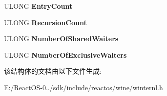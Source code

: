 \begin{DoxyCompactItemize}
\mbox{\label{struct___d_e_b_u_g___l_o_c_k___i_n_f_o_r_m_a_t_i_o_n_aebfe10b6c233b988ad9a8b3b876435b1}} 
U\+L\+O\+NG {\bfseries Entry\+Count}
\item 
\mbox{\label{struct___d_e_b_u_g___l_o_c_k___i_n_f_o_r_m_a_t_i_o_n_ab6a46410283b5aa5d7630f73743fc5a4}} 
U\+L\+O\+NG {\bfseries Recursion\+Count}
\item 
\mbox{\label{struct___d_e_b_u_g___l_o_c_k___i_n_f_o_r_m_a_t_i_o_n_a0942fe816bcc2dc81dc0b42c4f07841f}} 
U\+L\+O\+NG {\bfseries Number\+Of\+Shared\+Waiters}
\item 
\mbox{\label{struct___d_e_b_u_g___l_o_c_k___i_n_f_o_r_m_a_t_i_o_n_a6c8e17f7cf36f9dced58f0f592bee335}} 
U\+L\+O\+NG {\bfseries Number\+Of\+Exclusive\+Waiters}
\end{DoxyCompactItemize}


该结构体的文档由以下文件生成\+:\begin{DoxyCompactItemize}
\item 
E\+:/\+React\+O\+S-\/0../sdk/include/reactos/wine/winternl.\+h\end{DoxyCompactItemize}
